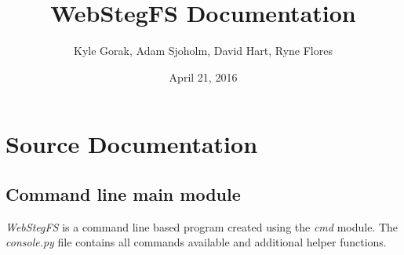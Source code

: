 \documentclass[letterpaper,12pt,openany,oneside]{sphinxmanual}
\title{WebStegFS Documentation}
\date{April 21, 2016}
\author{Kyle Gorak, Adam Sjoholm, David Hart, Ryne Flores}
\begin{document}
\maketitle
\tableofcontents
{}\label{index::doc}



\chapter{Source Documentation}
\label{index:source-documentation}

\section{Command line main module}
\label{console::doc}\label{console:module-webStegFS.console}\label{console:command-line-main-module}
\emph{WebStegFS} is a command line based program created using the \emph{cmd} module.
The \emph{console.py} file contains all commands available and additional helper
functions.
\end{document}
